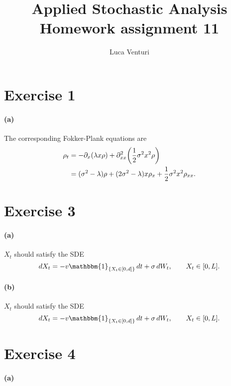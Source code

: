 \documentclass[a4paper,11pt]{article}
\theoremstyle{definition}
\theoremstyle{plain}
\theoremstyle{remark}
\DeclarePairedDelimiter{\parr}{(}{)}
\DeclarePairedDelimiter{\bra}{\lbrace}{\rbrace}
\begin{document}
\title{Applied Stochastic Analysis \\ Homework assignment 11}
\author{Luca Venturi}
\maketitle

\section*{Exercise 1}

\paragraph*{(a)}

The corresponding Fokker-Plank equations are
\begin{align*}
\rho_t & = -\partial_x(\lambda x\rho) + \partial^2_{xx}\parr*{\frac{1}{2}\sigma^2x^2\rho} \\ & = (\sigma^2-\lambda)\rho + (2\sigma^2 -\lambda)x\rho_x + \frac{1}{2}\sigma^2x^2\rho_{xx}.
\end{align*}

\section*{Exercise 3}

\paragraph*{(a)}

$X_t$ should satisfy the SDE
$$
dX_t = -v\mathbbm{1}_{\bra{X_t\in[0,d]}}\,dt + \sigma\,dW_t, \qquad X_t \in [0,L].
$$

\paragraph*{(b)}

$X_t$ should satisfy the SDE
$$
dX_t = -v\mathbbm{1}_{\bra{X_t\in[0,d]}}\,dt + \sigma\,dW_t, \qquad X_t \in [0,L].
$$

\section*{Exercise 4}

\paragraph*{(a)}
\end{document}
